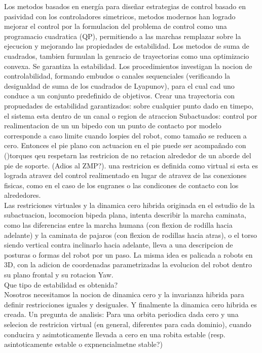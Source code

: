 \documentclass[10pt,onecolumn,twoside,letterpaper]{article}
\begin{document}
Los metodos basados en energ\'ia  para dise\~nar estrategias de control basado en pasividad con los controladores simetricos, metodos modernos han logrado mejorar el control por la formulacion del problema de control como una programacio cuadratica (QP), permitiendo a las marchas remplazar sobre la ejecucion y mejorando las propiedades de estabilidad. Los metodos de suma de cuadrados, tambien furmulan la genracio de trayectorias como una optimizacio convexa. Se garantiza la estabilidad. Los procedimientos investigan la nocion de controlabilidad, formando embudos o canales sequenciales (verificando la desigualdad de suma de los cuadrados de Lyapunov), para el cual cad uno conduce a un conjunto predefinido de objetivos. Crear una trayectoria con propuedades de estabilidad garantizados: sobre cualquier punto dado en timepo, el sistema esta dentro de un canal o region de atraccion\cite{Grizzle2014}
Subactuados: control por realimentacion de un un bipedo con un punto de contacto por modelo corresponde a caso limite cuando lospies del robot, como tama\~no se reducen a cero. Entonces el pie plano con actuacion en el pie puede ser acompa\~nado con ()torques qeu respetarn las restricion de no retacion alrededor de un aborde del pie de soporte. (Adios al ZMP?). una restricion es definida como virtual si esta es lograda atravez del control realimentado en lugar de atravez de las conexiones fisicas, como en el caso de los engranes o las condicones de contacto con los alrededores.\\
Las restriciones virtuales y la dinamica cero hibrida originada en el estudio de la subactuacion, locomocion bipeda plana, intenta describir la marcha caminata, como las diferencias entre la marcha humana (con flexion de rodilla hacia adelante) y la caminata de pajaros (con flexion de rodillas hacia atras), o el torso siendo vertical contra inclinarlo hacia adelante, lleva a una descripcion de posturas o formas del robot por un paso. La misma idea es palicada a robots en 3D, con la adicion de coordenadas parametrizadas la evolucion del robot dentro su plano frontal y su rotacion Yaw.\cite{Grizzle2014}\\
Que tipo de estabilidad es obtenida?\\
Nosotros necesitamos la nocion de dinamica cero y la invarianza hibrida para definir restricciones iguales y desiguales. Y finalmente la dinamica cero hibrida es creada. Un pregunta de analisis: Para una orbita periodica dada cero y una selecion de restricion virtual (en general, diferentes para cada dominio), cuando conducira y asimtoticamente llevada a cero en una robita estable (resp. asintoticamente estable o expnencialmetne stable?)\\
\end{document}
